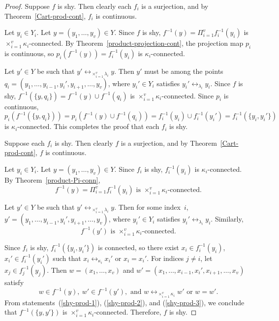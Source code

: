 \documentclass{article}
\theoremstyle{plain}
\theoremstyle{definition}
\numberwithin{thm}{section}
\newcommand{\adj}{\leftrightarrow}
\begin{document}
\begin{proof}
Suppose $f$ is shy. Then clearly
each $f_i$ is a surjection, and by
Theorem~\ref{Cart-prod-cont}, $f_i$
is continuous.

Let $y_i \in Y_i$. Let
$y=(y_1,\ldots, y_v) \in Y$.
Since $f$ is shy,
$f^{-1}(y)=\Pi_{i=1}^v f_i^{-1}(y_i)$ is $\times_{i=1}^v \kappa_i$-connected. By
Theorem~\ref{product-projection-cont}, the projection map $p_i$ is
continuous, so
$p_i(f^{-1}(y))=f_i^{-1}(y_i)$ is
$\kappa_i$-connected.

Let $y' \in Y$ be such that
$y' \adj_{\times_{i=1}^v \lambda_i} y$. Then $y'$ must be among the
points $q_i=(y_1,\ldots,y_{i-1},y_i',y_{i+1},\ldots,y_v)$, where
$y_i' \in Y_i$ satisfies $y_i' \adj_{\lambda_i} y_i$. Since $f$ is shy,
$f^{-1}(\{y,q_i\})=f^{-1}(y) \cup f^{-1}(q_i)$
is $\times_{i=1}^v \kappa_i$-connected. Since $p_i$ is
continuous,
\[ p_i(f^{-1}(\{y,q_i\}))=p_i(f^{-1}(y) \cup f^{-1}(q_i))=f_i^{-1}(y_i) \cup f_i^{-1}(y_i')=f_i^{-1}(\{y_i,y_i'\})
\]
is $\kappa_i$-connected. This completes the proof that each $f_i$ is shy.

Suppose each $f_i$ is shy. Then clearly $f$ is a surjection, and
by Theorem~\ref{Cart-prod-cont}, $f$ is continuous.

Let $y_i \in Y_i$. Let $y=(y_1,\ldots, y_v) \in Y$.
Since $f_i$ is shy, $f_i^{-1}(y_i)$ is $\kappa_i$-connected. By
Theorem~\ref{product-Pi-conn},
\begin{equation}
\label{shy-prod-1}
f^{-1}(y)=\Pi_{i=1}^v f_i^{-1}(y_i)
\mbox{ is } \times_{i=1}^v \kappa_i\mbox{-connected.}
\end{equation}

Let $y' \in Y$ be such that
$y' \adj_{\times_{i=1}^v \lambda_i} y$. Then for some index~$i$, 
$y'=(y_1,\ldots,y_{i-1},y_i',y_{i+1},\ldots,y_v)$, where
$y_i' \in Y_i$ satisfies $y_i' \adj_{\lambda_i} y_i$. Similarly,
\begin{equation}
\label{shy-prod-2}
f^{-1}(y') \mbox{ is }
\times_{i=1}^v \kappa_i\mbox{-connected.}
\end{equation}

Since $f_i$ is shy, $f_i^{-1}(\{y_i,y_i'\})$
is connected, so there exist $x_i \in f_i^{-1}(y_i)$,
$x_i' \in f_i^{-1}(y_i')$ such that
$x_i \adj_{\kappa_i} x_i'$ or $x_i = x_i'$. For indices $j \ne i$, 
let $x_j \in f_j^{-1}(y_j)$. Then
$w=(x_1,\ldots, x_v)$ and
$w'=(x_1,\ldots, x_{i-1},x_i',x_{i+1},\ldots, x_v)$ satisfy 
\begin{equation}
\label{shy-prod-3}
w \in f^{-1}(y),~ w' \in f^{-1}(y'), \mbox{ and }
w \adj_{\times_{i=1}^v \kappa_i} w'
\mbox{ or } w=w'.
\end{equation}
From statements~(\ref{shy-prod-1}),
(\ref{shy-prod-2}), and
(\ref{shy-prod-3}), we conclude that
$f^{-1}(\{y,y'\})$ is
$\times_{i=1}^v \kappa_i$-connected.
Therefore, $f$ is shy.
\end{proof}
\end{document}

